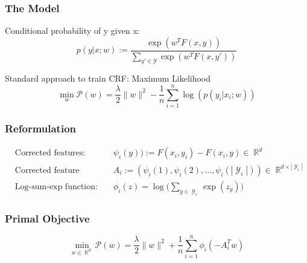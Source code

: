 \documentclass{beamer}
\DeclareMathOperator{\R}{\mathbb{R}}
\DeclareMathOperator{\1}{\mathbb{1}}
\DeclareMathOperator{\Y}{\mathcal{Y}}
\begin{document}
\begin{frame}
\frametitle{The Model}

Conditional probability of y given x:
\begin{equation*}
	\label{primal probability}
	p(y | x ; w) := \frac{\exp(w^TF(x, y))}{\sum_{y' \in \mathcal{Y}} \exp(w^TF(x, y'))}
\end{equation*}

Standard approach to train CRF: Maximum Likelihood
\begin{equation*}
	\min_w \mathscr P(w)  = \frac{\lambda}{2}\|w\|^2 - \frac{1}{n}   \sum_{i=1}^{n} \log(p(y_i|x_i; w))
\end{equation*}

\end{frame}
\begin{frame}
\frametitle{Reformulation}

\begin{align*}
	&\textrm{Corrected features:} & \psi_i(y)) := F(x_i, y_i) - F(x_i, y) \in \R^d \\
	&\textrm{Corrected feature matrix:} & A_i := ( \psi_i(1),\psi_i(2),...,\psi_i(|\Y_i|) ) \in \R^{d\times |\Y_i|} \\
	&\textrm{Log-sum-exp function:} & \phi_i(z) = \log \big(\sum_{y\in \Y_i} \exp(z_y)\big)
\end{align*}

\end{frame}
\begin{frame}
\frametitle{Primal Objective}

\begin{equation}
	\min_{w\in\R^d}  \mathscr P(w) = \frac{\lambda}{2}\|w\|^2 + \frac{1}{n}   \sum_{i=1}^{n} \phi_i(-A_i^Tw)
\end{equation}

\end{frame}
\end{document}
